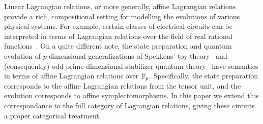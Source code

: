 Linear Lagrangian relations, or more generally, affine Lagrangian relations provide a rich, compositional setting for modelling the evolutions of various physical systems. For example, certain classes of electrical circuits can be interpreted in terms of Lagrangian relations over the field of real rational functions~\cite{passive,affine}. On a quite different note, the state preparation and quantum evolution of $p$-dimensional generalizations of Spekkens' toy theory~\cite{spekkens2016quasi} and (consequently) odd-prime-dimensional stabilizer quantum theory~\cite{gross} have semantics in terms of affine Lagrangian relations over $\mathbb{F}_p$.  Specifically, the state preparation corresponds to the affine Lagrangian relations from the tensor unit, and the evolution corresponds to affine symplectomorphisms.  In this paper we extend this correspondance to the full category of Lagrangian relations, giving these circuits a proper categorical treatment.

